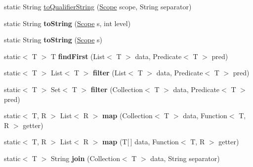 \begin{DoxyCompactItemize}
\item 
static String \hyperlink{classlime_1_1antlr4_1_1Utils_a753bab7a7ce1e75351fef66487869748}{to\+Qualifier\+String} (\hyperlink{interfacelime_1_1antlr4_1_1Scope}{Scope} scope, String separator)
\item 
\mbox{\label{classlime_1_1antlr4_1_1Utils_a7e4eb8ca0b77483acd2bfc909111c771}} 
static String {\bfseries to\+String} (\hyperlink{interfacelime_1_1antlr4_1_1Scope}{Scope} s, int level)
\item 
\mbox{\label{classlime_1_1antlr4_1_1Utils_a6fe5578e6369ff70ffc99da9630465e0}} 
static String {\bfseries to\+String} (\hyperlink{interfacelime_1_1antlr4_1_1Scope}{Scope} s)
\item 
\mbox{\label{classlime_1_1antlr4_1_1Utils_a612624884fec0acd13ed234e5e26094f}} 
static$<$ T $>$ T {\bfseries find\+First} (List$<$ T $>$ data, Predicate$<$ T $>$ pred)
\item 
\mbox{\label{classlime_1_1antlr4_1_1Utils_ad6f7eec2cdb994379d11652460d3efd2}} 
static$<$ T $>$ List$<$ T $>$ {\bfseries filter} (List$<$ T $>$ data, Predicate$<$ T $>$ pred)
\item 
\mbox{\label{classlime_1_1antlr4_1_1Utils_a3e7f5498a8eac71ff86f33f2dd843b47}} 
static$<$ T $>$ Set$<$ T $>$ {\bfseries filter} (Collection$<$ T $>$ data, Predicate$<$ T $>$ pred)
\item 
\mbox{\label{classlime_1_1antlr4_1_1Utils_aeebef010496353e280224ced20ee41e8}} 
static$<$ T, R $>$ List$<$ R $>$ {\bfseries map} (Collection$<$ T $>$ data, Function$<$ T, R $>$ getter)
\item 
\mbox{\label{classlime_1_1antlr4_1_1Utils_a038d570aad9ea3a6190f46d0b6f37b08}} 
static$<$ T, R $>$ List$<$ R $>$ {\bfseries map} (T\mbox{[}$\,$\mbox{]} data, Function$<$ T, R $>$ getter)
\item 
\mbox{\label{classlime_1_1antlr4_1_1Utils_a2c8faab9912021d86b18e3f26bfec9ea}} 
static$<$ T $>$ String {\bfseries join} (Collection$<$ T $>$ data, String separator)

\end{DoxyCompactItemize}
